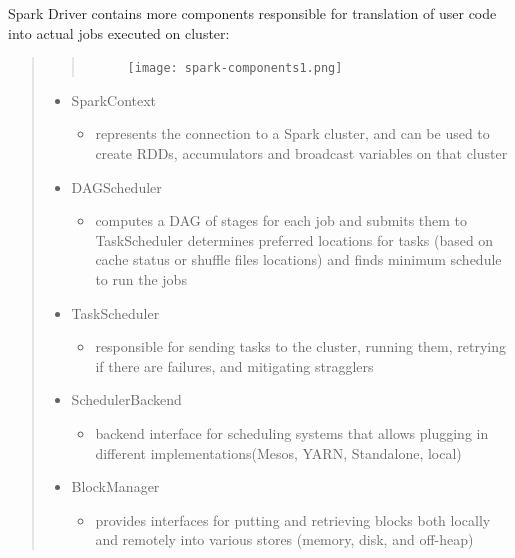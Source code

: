 \documentclass[letterpaper,11pt,english]{sphinxmanual}
\begin{document}
Spark Driver contains more components responsible for translation
of user code into actual jobs executed on cluster:
\begin{quote}
\begin{quote}
\begin{figure}[htbp]
\centering

\texttt{[image: spark-components1.png]}
\label{introduction:fig-spark-components1}\end{figure}
\end{quote}
\begin{itemize}
\item {} 
SparkContext
\begin{itemize}
\item {} 
represents the connection to a Spark cluster, and can be used to create RDDs,
accumulators and broadcast variables  on that cluster

\end{itemize}

\item {} 
DAGScheduler
\begin{itemize}
\item {} 
computes a DAG of stages for each job and submits them to TaskScheduler
determines preferred locations for tasks (based on cache status or
shuffle files locations) and finds minimum schedule to run the jobs

\end{itemize}

\item {} 
TaskScheduler
\begin{itemize}
\item {} 
responsible for sending tasks to the cluster, running them,
retrying if there are failures, and mitigating stragglers

\end{itemize}

\item {} 
SchedulerBackend
\begin{itemize}
\item {} 
backend interface for scheduling systems that allows plugging
in different implementations(Mesos, YARN, Standalone, local)

\end{itemize}

\item {} 
BlockManager
\begin{itemize}
\item {} 
provides interfaces for putting and retrieving blocks both locally
and remotely into various stores (memory,  disk, and off-heap)

\end{itemize}

\end{itemize}
\end{quote}
\end{document}
